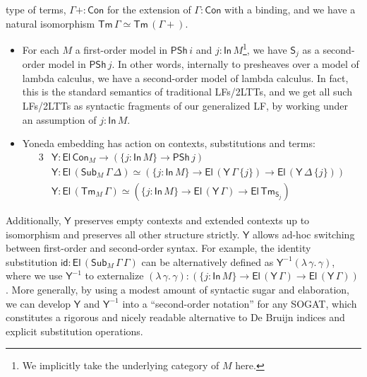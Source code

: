 \documentclass{easychair}
\newcommand{\msf}[1]{{\mathsf{#1}}}
\newcommand{\PSh}{\msf{PSh}}
\newcommand{\El}{\msf{El}}
\newcommand{\In}{\msf{In}}
\newcommand{\Tm}{\msf{Tm}}
\newcommand{\Con}{\msf{Con}}
\newcommand{\Sub}{\msf{Sub}}
\newcommand{\Y}{\msf{Y}}
\renewcommand{\S}{\msf{S}}
\begin{document}
type of terms, $\Gamma+ : \Con$ for the extension of $\Gamma : \Con$ with a
binding, and we have a natural isomorphism $\Tm\,\Gamma \simeq \Tm\,(\Gamma+)$.
\begin{itemize}
\item For each $M$ a first-order model in $\PSh\,i$ and $j : \In\,M$\footnote{We
implicitly take the underlying category of $M$ here.}, we have $\msf{S}_j$ as a
  second-order model in $\PSh\,j$. In other words, internally to presheaves over
  a model of lambda calculus, we have a second-order model of lambda
  calculus. In fact, this is the standard semantics of traditional LFs/2LTTs,
  and we get all such LFs/2LTTs as syntactic fragments of our generalized LF, by
  working under an assumption of $j : \In\,M$.
\item Yoneda embedding has action on contexts, substitutions and terms:
  \begin{alignat*}{3}
    & \Y : \El\,\Con_M \to (\{j : \In\,M\} \to \PSh\,j)\\
    & \Y : \El\,(\Sub_M\,\Gamma\,\Delta) \simeq (\{j : \In\,M\} \to \El\,(\Y\,\Gamma\,\{j\}) \to \El\,(\Y\,\Delta\,\{j\}))\\
    & \Y : \El\,(\Tm_M\,\Gamma) \simeq (\{j : \In\,M\} \to \El\,(\Y\,\Gamma) \to \El\,\Tm_{\S_j})
  \end{alignat*}
\end{itemize}
Additionally, $\Y$ preserves empty contexts and extended contexts up to
isomorphism and preserves all other structure strictly. $\Y$ allows ad-hoc
switching between first-order and second-order syntax. For example, the identity
substitution $\msf{id} : \El\,(\Sub_M\,\Gamma\,\Gamma)$ can be alternatively defined as
$\Y^{-1}(\lambda\,\gamma.\,\gamma)$, where we use $\Y^{-1}$ to externalize
$(\lambda\,\gamma.\,\gamma) : (\{j : \In\,M\} \to \El\,(\Y\,\Gamma) \to
\El\,(\Y\,\Gamma))$. More generally, by using a modest amount of syntactic sugar
and elaboration, we can develop $\Y$ and $\Y^{-1}$ into a ``second-order
notation'' for any SOGAT, which constitutes a rigorous and nicely readable
alternative to De Bruijn indices and explicit substitution operations.
\\
\end{document}
